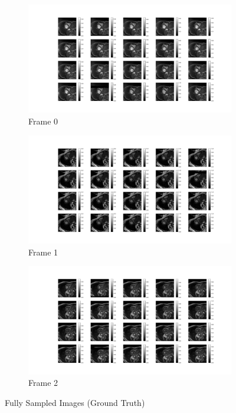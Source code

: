 \documentclass{article}
\begin{document}
\begin{figure}[H]
  \centering
  \begin{subfigure}[b]{0.32\linewidth}
    \includegraphics[width=\linewidth]{../images/No_opt/full_sampling/full_sampling_0.png}
    \caption{Frame 0}
  \end{subfigure}
  \begin{subfigure}[b]{0.32\linewidth}
    \includegraphics[width=\linewidth]{../images/No_opt/full_sampling/full_sampling_1.png}
    \caption{Frame 1}
  \end{subfigure}
  \begin{subfigure}[b]{0.32\linewidth}
    \includegraphics[width=\linewidth]{../images/No_opt/full_sampling/full_sampling_2.png}
    \caption{Frame 2}
  \end{subfigure}
  \caption{Fully Sampled Images (Ground Truth)}
  \label{fig:full_sampled_no_opt}
\end{figure}
\end{document}
